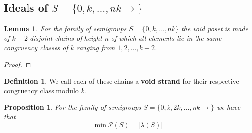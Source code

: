 \documentclass[11pt,letterpaper]{article}
\newtheorem{lem}[thm]{Lemma}
\newtheorem{prop}[thm]{Proposition}
\theoremstyle{definition}
\newtheorem{defn}[thm]{Definition}
\begin{document}
\newpage

\begin{center}
    \section{Ideals of $S=\{0,k,...,nk\rightarrow\}$}
\end{center}






\begin{lem}
    \label{poset nk}
    For the family of semigroups $S=\{0,k,...,nk\}$ the void poset is made of $k-2$ disjoint chains of height $n$ of which all elements lie in the same congruency classes of $k$ ranging from $1,2,...,k-2$.
\end{lem}

\begin{proof}
    
\end{proof}

\begin{defn}
    We call each of these chains a \textbf{void strand} for their respective congruency class modulo $k$.
\end{defn}





\begin{prop}
    For the family of semigroups $S=\{0,k,2k,...,nk\rightarrow\}$ we have that 
    \[\min\mathcal{P}(S)=|\lambda(S)|\]
\end{prop}
\end{document}
